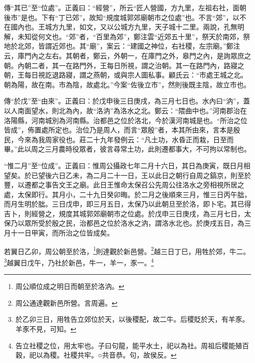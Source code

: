 {\noindent\zhuan{}\fzbyks 傳“其已”至“位處”。正義曰：“經營”，所云“匠人營國，方九里，左祖右社，面朝後市”是也。下有“丁已郊”，故知“規度城郭郊廟朝市之位處”也。不言“郊”，以不在國內也。王城方九里，如文，又以公城方九里，天子城十二里。兩說，孔無明解，未知從何文也。“郊”者，“百里為郊”，鄭注雲“近郊五十里”，祭天於南郊，祭地於北郊，皆謂近郊也。其“廟”，案云：“建國之神位，右社稷，左宗廟。”鄭注云，庫門內之左右。其朝者，鄭云，外朝一，在庫門之外，皋門之內，是詢眾庶之朝。內朝二者，其一在路門外，王每日所視，謂之治朝。其一在路門內，路寢之朝，王每日視訖退路寢，謂之燕朝，或與宗人圖私事。顧氏云：“市處王城之北。朝為陽，故在南。市為陰，故處北。”今案“佐後立市”，然則後既主陰，故立市也。 \par}

{\noindent\zhuan{}\fzbyks 傳“於戊”至“由來”。正義曰：於戊申後三日庚戌，為三月七日也。水內曰“汭”，蓋以人南面望水，則北為內，故“洛汭”為洛水之北。鄭云：“隈曲中也。”河南郡治在洛陽縣，河南城別為河南縣。治都邑之位於洛北，今於漢河南城是也。“所治之位皆成”，佈置處所定也。治位乃是周人，而言“眾殷”者，本其所由來，言本是殷民，今來為我周家役也。莊二十九年發例云：“凡土功，水昏正而栽，日至而畢。”此以周之三月農時役眾者，彼言尋常土功，此則遷都事大，不可拘以常制也。 \par}

{\noindent\shu{}\fzkt “惟二月”至“位成”。正義曰：惟周公攝政七年二月十六日，其日為庚寅，既日月相望矣。於已望後六日乙未，為二月二十一日，王以此日之朝行自周之鎬京，則至於豐，以遷都之事告文王之廟。此日王惟命太保召公先周公往洛水之旁相視所居之處，太保即行。其月小，二十九日癸卯晦。於二月之後順來三月，惟三日丙午朏，而月生明於朏。三日戊申，即三月五日，太保乃以此朝旦至於洛，即卜宅。其已得吉卜，則經營之，規度其城郭郊廟朝市之位處。於戊申三日庚戌，為三月七日，太保乃以眾所受於殷之民，治都邑之位於洛水之汭，謂洛水北也。於庚戌五日，為三月十一日甲寅，而所治之位皆成矣。 \par}

若翼日乙卯，周公朝至於洛，\footnote{周公順位成之明日而朝至於洛汭。}則達觀於新邑營。\footnote{周公通達觀新邑所營。言周遍。}越三日丁巳，用牲於郊，牛二。\footnote{於乙卯三日，用牲告立郊位於天，以後稷配，故二牛。后稷貶於天，有羊豕。羊豕不見，可知。}越翼日戊午，乃社於新邑，牛一，羊一，豕一。\footnote{告立社稷之位，用太牢也。子曰句龍，能平水土，祀以為社。周祖后稷能殖百穀，祀以為稷。社稷共牢。○共音恭。句，故侯反。}


